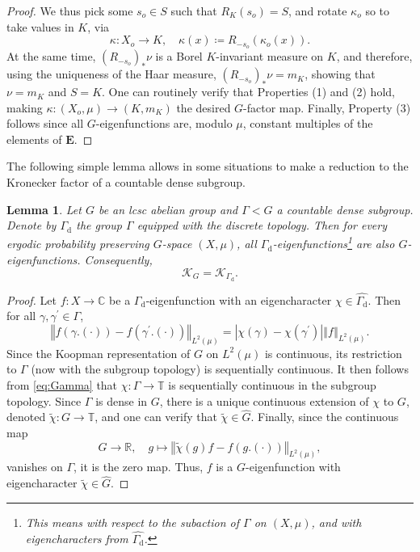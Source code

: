\documentclass{amsart}
\numberwithin{equation}{subsection}
\newtheorem{lem}[thm]{Lemma}
\theoremstyle{remark}
\begin{document}
\begin{proof}
We thus pick some \(s_{o}\in S\) such that \(R_{K}\left(s_{o}\right)=S\), and rotate \(\kappa_{o}\) so to take values in \(K\), via
\[\kappa:X_{o}\to K,\quad \kappa\left(x\right)\coloneqq R_{-s_{o}}\left(\kappa_{o}\left(x\right)\right).\]
At the same time, \(\left(R_{-s_{o}}\right)_{\ast}\nu\) is a Borel \(K\)-invariant measure on \(K\), and therefore, using the uniqueness of the Haar measure, \(\left(R_{-s_{o}}\right)_{\ast}\nu=m_{K}\), showing that \(\nu=m_{K}\) and \(S=K\). One can routinely verify that Properties (1) and (2) hold, making \(\kappa:\left(X_{o},\mu\right)\to\left(K,m_{K}\right)\) the desired \(G\)-factor map. Finally, Property (3) follows since all \(G\)-eigenfunctions are, modulo \(\mu\), constant multiples of the elements of \(\mathbf{E}\).
\end{proof}

The following simple lemma allows in some situations to make a reduction to the Kronecker factor of a countable dense subgroup.

\begin{lem}\label{lem:gamkro}
Let \(G\) be an lcsc abelian group and \(\Gamma<G\) a countable dense subgroup. Denote by \(\Gamma_{\mathrm{d}}\) the group \(\Gamma\) equipped with the discrete topology. Then for every ergodic probability preserving \(G\)-space \(\left(X,\mu\right)\), all \(\Gamma_{\mathrm{d}}\)-eigenfunctions\footnote{This means with respect to the subaction of \(\Gamma\) on \(\left(X,\mu\right)\), and with eigencharacters from \(\widehat{\Gamma_{\mathrm{d}}}\).} are also \(G\)-eigenfunctions. Consequently, \[\mathcal{K}_{G}=\mathcal{K}_{\Gamma_{\mathrm{d}}}.\]
\end{lem}

\begin{proof}
Let \(f:X\to\mathbb{C}\) be a \(\Gamma_{\mathrm{d}}\)-eigenfunction with an eigencharacter \(\chi\in\widehat{\Gamma_{\mathrm{d}}}\). Then for all \(\gamma,\gamma^{\prime}\in\Gamma\),
\begin{equation}\label{eq:Gamma}
\left\Vert f\left(\gamma.\left(\cdot\right)\right)-f\left(\gamma^{\prime}.\left(\cdot\right)\right)\right\Vert_{L^{2}\left(\mu\right)}=\left|\chi\left(\gamma\right)-\chi\left(\gamma^{\prime}\right)\right|\left\Vert f\right\Vert_{L^{2}\left(\mu\right)} .
\end{equation}
Since the Koopman representation of \(G\) on \(L^{2}\left(\mu\right)\) is continuous, its restriction to \(\Gamma\) (now with the subgroup topology) is sequentially continuous. It then follows from \eqref{eq:Gamma} that \(\chi:\Gamma\to\mathbb{T}\) is sequentially continuous in the subgroup topology. Since \(\Gamma\) is dense in \(G\), there is a unique continuous extension of \(\chi\) to \(G\), denoted \(\widetilde{\chi}:G\to\mathbb{T}\), and one can verify that \(\widetilde{\chi}\in\widehat{G}\). Finally, since the continuous map
\[G\longrightarrow\mathbb{R},\quad g\mapsto\left\Vert \widetilde{\chi}\left(g\right)f-f\left(g.\left(\cdot\right)\right)\right\Vert_{L^{2}\left(\mu\right)},\]
vanishes on \(\Gamma\), it is the zero map. Thus, \(f\) is a \(G\)-eigenfunction with eigencharacter \(\widetilde{\chi}\in\widehat{G}\).
\end{proof}
\end{document}
